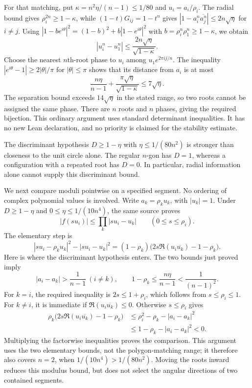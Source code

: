 For that matching, put $\kappa=n^2\eta/(n-1)\le1/80$ and
$u_i=a_i/\rho_i$. The radial bound gives
$\rho_i^{2n}\ge1-\kappa$, while
$(1-t)G_{ij}=1-t^n$ gives
$|1-a_i^n\overline{a_j^n}|\le2n\sqrt\eta$ for $i\ne j$.
Using
$|1-be^{i\theta}|^2=(1-b)^2+b|1-e^{i\theta}|^2$ with
$b=\rho_i^n\rho_1^n\ge1-\kappa$, we obtain
\[
 |u_i^n-u_1^n|\le\frac{2n\sqrt\eta}{\sqrt{1-\kappa}}.
\]
Choose the nearest $n$th-root phase to $u_i$ among
$u_1e^{2\pi i j/n}$. The inequality
$|e^{i\theta}-1|\ge2|\theta|/\pi$ for $|\theta|\le\pi$
shows that its distance from $a_i$ is at most
\[
 \frac{n\eta}{n-1}+\frac{\pi\sqrt\eta}{\sqrt{1-\kappa}}
 \le7\sqrt\eta.
\]
The separation bound exceeds $14\sqrt\eta$ in the stated range,
so two roots cannot be assigned the same phase. There are $n$ roots and
$n$ phases, giving the required bijection. This ordinary argument uses standard determinant inequalities.
It has no new Lean declaration, and no priority is claimed for the
stability estimate.

The discriminant hypothesis $D\ge1-\eta$ with $\eta\le1/(80n^2)$
is stronger than closeness to the unit circle alone. The regular $n$-gon has $D=1$, whereas a configuration with
a repeated root has $D=0$. In particular, radial information alone cannot
supply this discriminant bound.

We next compare moduli pointwise on a specified segment. No ordering
of complex polynomial values is involved. Write
$a_k=\rho_k u_k$, with $|u_k|=1$. Under
$D\ge1-\eta$ and $0\le\eta\le1/(10n^4)$, the same source proves
\[
 |f(su_i)|\le\prod_k|su_i-u_k|
 \qquad(0\le s\le\rho_i).
\]
The elementary step is
\[
 |su_i-\rho_ku_k|^2-|su_i-u_k|^2
 =(1-\rho_k)\bigl(2s\Re(u_i\overline{u_k})-1-\rho_k\bigr).
\]
Here is where the discriminant hypothesis enters. The two bounds just
proved imply
\[
 |a_i-a_k|>\frac1{n-1}\ (i\ne k),\qquad
 1-\rho_k\le\frac{n\eta}{n-1}<\frac1{(n-1)^2}.
\]
For $k=i$, the required inequality is $2s\le1+\rho_i$, which follows
from $s\le\rho_i\le1$. For $k\ne i$, it is immediate if
$\Re(u_i\overline{u_k})\le0$. Otherwise $s\le\rho_i$ gives
\[
\begin{split}
 \rho_k\bigl(2s\Re(u_i\overline{u_k})-1-\rho_k\bigr)
 &\le\rho_i^2-\rho_k-|a_i-a_k|^2\\
 &\le1-\rho_k-|a_i-a_k|^2<0.
\end{split}
\]
Multiplying the factorwise inequalities proves the comparison. This
argument uses the two elementary bounds, not the polygon-matching range;
it therefore also covers $n=2$, when $1/(10n^4)>1/(80n^2)$.
Moving the roots inward reduces this modulus bound, but does not select
the angular directions of two contained segments.

